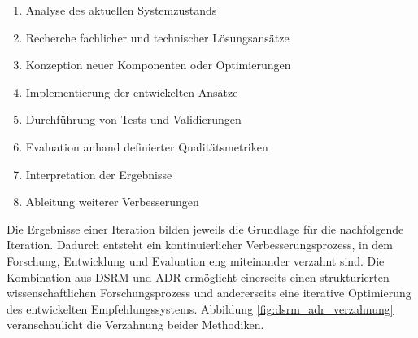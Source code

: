 \begin{enumerate} 
\item Analyse des aktuellen Systemzustands 
\item Recherche fachlicher und technischer Lösungsansätze 
\item Konzeption neuer Komponenten oder Optimierungen 
\item Implementierung der entwickelten Ansätze 
\item Durchführung von Tests und Validierungen 
\item Evaluation anhand definierter Qualitätsmetriken 
\item Interpretation der Ergebnisse 
\item Ableitung weiterer Verbesserungen 
\end{enumerate} 

Die Ergebnisse einer Iteration bilden jeweils die Grundlage für die nachfolgende Iteration. Dadurch entsteht ein kontinuierlicher Verbesserungsprozess, in dem Forschung, Entwicklung und Evaluation eng miteinander verzahnt sind. 
Die Kombination aus DSRM und ADR ermöglicht einerseits einen strukturierten wissenschaftlichen Forschungsprozess und andererseits eine iterative Optimierung des entwickelten Empfehlungssystems. 
Abbildung \ref{fig:dsrm_adr_verzahnung} veranschaulicht die Verzahnung beider Methodiken.

